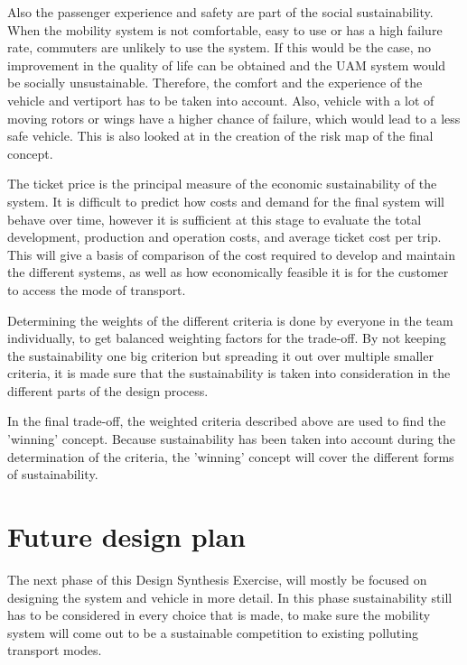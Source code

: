 Also the passenger experience and safety are part of the social sustainability. When the mobility system is not comfortable, easy to use or has a high failure rate, commuters are unlikely to use the system. If this would be the case, no improvement in the quality of life can be obtained and the UAM system would be socially unsustainable. Therefore, the comfort and the experience of the vehicle and vertiport has to be taken into account. Also, vehicle with a lot of moving rotors or wings have a higher chance of failure, which would lead to a less safe vehicle. This is also looked at in the creation of the risk map of the final concept.

The ticket price is the principal measure of the economic sustainability of the system. It is difficult to predict how costs and demand for the final system will behave over time, however it is sufficient at this stage to evaluate the total development, production and operation costs, and average ticket cost per trip. This will give a basis of comparison of the cost required to develop and maintain the different systems, as well as how economically feasible it is for the customer to access the mode of transport. 

Determining the weights of the different criteria is done by everyone in the team individually, to get balanced weighting factors for the trade-off. By not keeping the sustainability one big criterion but spreading it out over multiple smaller criteria, it is made sure that the sustainability is taken into consideration in the different parts of the design process.

In the final trade-off, the weighted criteria described above are used to find the 'winning' concept. Because sustainability has been taken into account during the determination of the criteria, the 'winning' concept will cover the different forms of sustainability.

\section{Future design plan}
\label{future}
The next phase of this Design Synthesis Exercise, will mostly be focused on designing the system and vehicle in more detail. In this phase sustainability still has to be considered in every choice that is made, to make sure the mobility system will come out to be a sustainable competition to existing polluting transport modes. 

